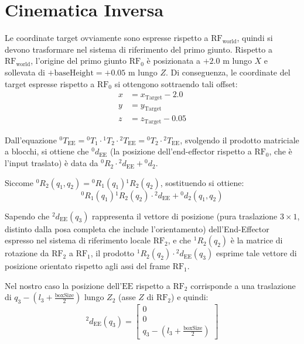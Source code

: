 ﻿\documentclass[11pt, a4paper]{article}
\author{Francesco Lo Verde}
\begin{document}
\section*{Cinematica Inversa}
Le coordinate target ovviamente sono espresse rispetto a $\text{RF}_{\text{world}}$, quindi si devono trasformare nel sistema di riferimento del primo giunto. Rispetto a $\text{RF}_{\text{world}}$, l'origine del primo giunto $\text{RF}_0$ è posizionata a $+2.0\text{ m}$ lungo $X$ e sollevata di $+\text{baseHeight} = +0.05\text{ m}$ lungo $Z$. Di conseguenza, le coordinate del target espresse rispetto a $\text{RF}_0$ si ottengono sottraendo tali offset:
\begin{align*}
x &= x_{\text{Target}} - 2.0 \\
y &= y_{\text{Target}} \\
z &= z_{\text{Target}} - 0.05
\end{align*}

Dall'equazione ${}^{0}T_{\text{EE}} = {}^{0}T_{1} \cdot {}^{1}T_{2} \cdot {}^{2}T_{\text{EE}} = {}^{0}T_{2} \cdot {}^{2}T_{\text{EE}}$, svolgendo il prodotto matriciale a blocchi, si ottiene che ${}^{0}d_{\text{EE}}$ (la posizione dell'end-effector rispetto a $\text{RF}_0$, che è l'input traslato) è data da ${}^{0}R_{2} \cdot {}^{2}d_{\text{EE}} + {}^{0}d_{2}$.

Siccome ${}^{0}R_{2}(q_1, q_2) = {}^{0}R_{1}(q_1){}^{1}R_{2}(q_2)$, sostituendo si ottiene:
\[
{}^{0}R_{1}(q_1){}^{1}R_{2}(q_2) \cdot {}^{2}d_{\text{EE}} + {}^{0}d_{2}(q_1, q_2)
\]

Sapendo che ${}^{2}d_{\text{EE}}(q_3)$ rappresenta il vettore di posizione (pura traslazione $3 \times 1$, distinto dalla posa completa che include l'orientamento) dell'End-Effector espresso nel sistema di riferimento locale $\text{RF}_2$, e che ${}^{1}R_{2}(q_2)$ è la matrice di rotazione da $\text{RF}_2$ a $\text{RF}_1$, il prodotto ${}^{1}R_{2}(q_2) \cdot {}^{2}d_{\text{EE}}(q_3)$ esprime tale vettore di posizione orientato rispetto agli assi del frame $\text{RF}_1$.

Nel nostro caso la posizione dell'$\text{EE}$ rispetto a $\text{RF}_2$ corrisponde a una traslazione di $q_3 - \left(l_3 + \frac{\text{boxSize}}{2}\right)$ lungo $Z_{2}$ (asse $Z$ di $\text{RF}_2$) e quindi:
\[
{}^{2}d_{\text{EE}}(q_3) = \begin{bmatrix} 0 \\ 0 \\ q_3 - \left(l_3 + \frac{\text{boxSize}}{2}\right) \end{bmatrix}
\]
\end{document}
